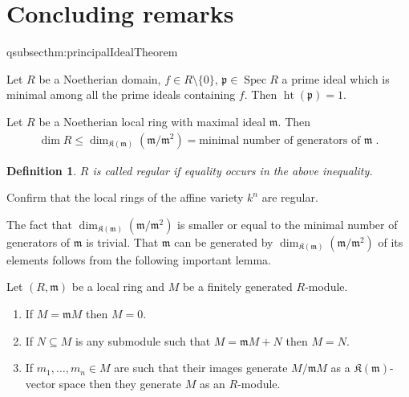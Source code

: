\documentclass[DIV=14,parskip=full,pointednumbers]{scrartcl}
\newenvironment{alphanumerate}{\begin{enumerate}[label={$(\alph*)$},ref=\curthm]}{\end{enumerate}}
\theoremstyle{cthm}
\theoremstyle{cvarthm}
\theoremstyle{cdef}
\newtheorem{defi}{Definition}[subsection]
\newcommand{\lbl}[1]{
	\label{#1}
	\ifmmode
	\expandafter\xdef\csname eqsubsec#1\endcsname{\thesubsection}
	\fi
}
\newcommand{\KK}{\mathfrak K}
\newcommand{\mm}{\mathfrak{m}}
\newcommand{\pp}{\mathfrak{p}}
\newcommand{\Spec}{\operatorname{Spec}}
\newcommand{\hoehe}{\operatorname{ht}}
\begin{document}
\setcounter{cor}{0}
\setcounter{defi}{0}
\setcounter{rem}{0}
\setcounter{fact}{0}
\setcounter{subsection}{0}
\section*{Concluding remarks}
	\begin{thm}\lbl{thm:principalIdealTheorem}
		Let $R$ be a Noetherian domain, $f\in R\setminus\{0\}$, $\pp\in \Spec R$ a prime ideal which is minimal among all the prime ideals containing $f$. Then $\hoehe(\pp) = 1$.
	\end{thm}
	\begin{cor}
		Let $R$ be a Noetherian local ring with maximal ideal $\mm$. Then
		\begin{align*}
			\dim R\leq\dim_{\KK(\mm)}(\mm/\mm^2)=\text{minimal number of generators of }\mm\;. 
		\end{align*}
	\end{cor}
	\begin{defi}
		$R$ is called regular if equality occurs in the above inequality.
	\end{defi}
	\begin{exc}
		Confirm that the local rings of the affine variety $k^n$ are regular.
	\end{exc}
	The fact that $\dim_{\KK(\mm)}(\mm/\mm^2)$ is smaller or equal to the minimal number of generators of $\mm$ is trivial. That $\mm$ can be generated by $\dim_{\KK(\mm)}(\mm/\mm^2)$ of its elements follows from the following important lemma.
	\begin{lem}
		Let $(R,\mm)$ be a local ring and $M$ be a finitely generated $R$-module.
		\begin{alphanumerate}
		\item
			If $M = \mm M$ then $M=0$.
		\item 
			If $N\subseteq M$ is any submodule such that $M = \mm M +N$ then $M=N$.
		\item 
			If $m_1,\ldots, m_n\in M$ are such that their images generate $M/\mm M$ as a $\KK(\mm)$-vector space then they generate $M$ as an $R$-module.
		\end{alphanumerate}

	\end{lem}
\end{document}
